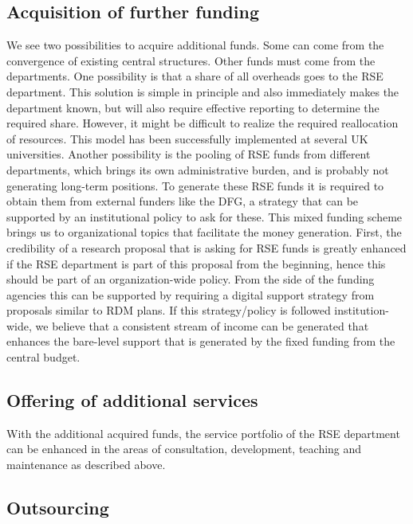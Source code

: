 \documentclass{article}
\begin{document}
\subsection{Acquisition of further funding}

We see two possibilities to acquire additional funds.
Some can come from the convergence of existing central structures.
Other funds must come from the departments. 
One possibility is that a share of all overheads goes to the RSE department.
This solution is simple in principle and also immediately makes the department known, but will also require effective reporting to determine the required share.
However, it might be difficult to realize the required reallocation of resources.
This model has been successfully implemented at several UK universities.
Another possibility is the pooling of RSE funds from different departments, which brings its own administrative burden, and is probably not generating long-term positions.
To generate these RSE funds it is required to obtain them from external funders like the DFG, a strategy that can be supported by an institutional policy to ask for these.
This mixed funding scheme brings us to organizational topics that facilitate the money generation.
First, the credibility of a research proposal that is asking for RSE funds is greatly enhanced if the RSE department is part of this proposal from the beginning, hence this should be part of an organization-wide policy.
From the side of the funding agencies this can be supported by requiring a digital support strategy from proposals similar to RDM plans.
If this strategy/policy is followed institution-wide, we believe that a consistent stream of income can be generated that enhances the bare-level support that is generated by the fixed funding from the central budget.

\subsection{Offering of additional services}

With the additional acquired funds, the service portfolio of the RSE department can be enhanced in the areas of consultation, development, teaching and maintenance as described above.

\subsection{Outsourcing}
\end{document}
